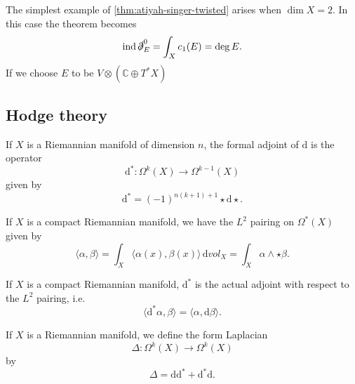 \documentclass[12pt,letterpaper,reqno]{article}
\numberwithin{equation}{section}
\newcommand{\C}{\ensuremath{\mathbb C}}
\newcommand{\dirac}{\slashed{\partial}}
\newcommand{\de}{\mathrm{d}}
\newcommand{\IP}[1]{\langle#1\rangle}
\DeclareMathOperator{\ind}{ind}
\newcommand{\fixme}[1]{{\color{orange}{[#1]}}}
\begin{document}
The simplest example of \autoref{thm:atiyah-singer-twisted} arises 
when $\dim X = 2$. In this case the theorem becomes
\begin{equation}
  \ind \dirac^0_E = \int_X c_1(E) = \deg E.
\end{equation}
If we choose $E$ to be $V \otimes (\C \oplus T^* X)$
\fixme{... explain relation to Riemann-Roch}


\subsection{Hodge theory}

\begin{defn}[Formal adjoint of $\de$]
If $X$ is a Riemannian manifold of dimension $n$,
the formal adjoint of $\de$
is the operator
\begin{equation}
  \de^*: \Omega^{k}(X) \to \Omega^{k-1}(X)
\end{equation}
given by
\begin{equation}
  \de^* = (-1)^{n(k+1)+1} \star \de \star.
\end{equation}
\end{defn}

If $X$ is a compact Riemannian manifold, we have
the $L^2$ pairing on $\Omega^*(X)$ given by
\begin{equation}
  \IP{\alpha,\beta} = \int_X \IP{\alpha(x),\beta(x)} \, \de vol_X = \int_X \alpha \wedge \star \beta.
\end{equation}

\begin{lem}
If $X$ is a compact Riemannian manifold, $\de^*$ is the actual adjoint
with respect to the $L^2$ pairing, i.e.
\begin{equation}
  \IP{\de^* \alpha,\beta} = \IP{\alpha,\de \beta}.
\end{equation}
\end{lem}

\begin{defn}
If $X$ is a Riemannian manifold, we define the form Laplacian
\begin{equation}
  \Delta: \Omega^k(X) \to \Omega^k(X)
\end{equation}
by
\begin{equation} \label{eq:form-laplacian}
  \Delta = \de \de^* + \de^* \de.
\end{equation}
\end{defn}
\fixme{...}
\end{document}
